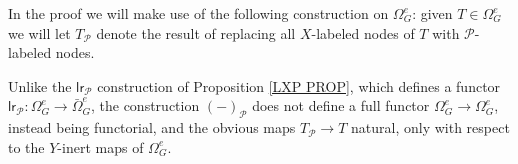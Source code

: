 \documentclass[a4paper,10pt]{article}%
\begin{document}
In the proof we will make use of the following construction on 
$\Omega_{G}^e$: given $T \in \Omega_{G}^e$ we will let $T_{\mathcal{P}}$ denote the result of replacing all $X$-labeled nodes of $T$ with $\mathcal{P}$-labeled nodes.

\begin{remark}\label{YINERT REM}
  Unlike the $\mathsf{lr}_{\mathcal{P}}$ construction of Proposition \ref{LXP PROP}, which defines a functor 
  $\mathsf{lr}_{\mathcal{P}} \colon
  \Omega_G^e \to \bar{\Omega}_G^e $,
  the construction 
  $(\minus)_{\mathcal{P}}$ does not define a full functor
  $\Omega_G^e \to \Omega_G^e$, instead being functorial, and the obvious maps $T_{\mathcal{P}} \to T$ natural, only with respect to the $Y$-inert maps of $\Omega_G^e$.
\end{remark}
\end{document}
